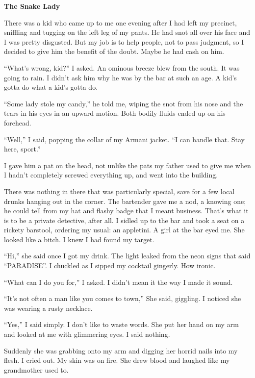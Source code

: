 

{\bf The Snake Lady}



There was a kid who came up to me one evening after I had left my
precinct, sniffling and tugging on the left leg of my pants. He had
snot all over his face and I was pretty disgusted. But my job is to
help people, not to pass judgment, so I decided to give him the
benefit of the doubt. Maybe he had cash on him.

``What's wrong, kid?'' I asked. An ominous breeze
blew from the south. It was going to rain. I didn't ask him
why he was by the bar at such an age. A kid's gotta do what a
kid's gotta do.

``Some lady stole my candy,'' he told me, wiping the snot
from his nose and the tears in his eyes in an upward motion. Both
bodily fluids ended up on his forehead.

``Well,'' I said, popping the collar of my Armani jacket.
``I can handle that. Stay here, sport.''

I gave him a pat on the head, not unlike the pats my father used to
give me when I hadn't completely screwed everything up, and
went into the building.



There was nothing in there that was particularly special, save for
a few local drunks hanging out in the corner. The bartender gave me
a nod, a knowing one; he could tell from my hat and flashy badge
that I meant business. That's what it is to be a private
detective, after all. I sidled up to the bar and took a seat on a
rickety barstool, ordering my usual: an appletini. A girl at the
bar eyed me. She looked like a bitch. I knew I had found my
target.



``Hi,'' she said once I got my drink. The light leaked
from the neon signs that said ``PARADISE''. I chuckled as
I sipped my cocktail gingerly. How ironic.

``What can I do you for,'' I asked. I didn't mean
it the way I made it sound.

``It's not often a man like you comes to town,''
She said, giggling. I noticed she was wearing a rusty
necklace.

``Yes,'' I said simply. I don't like to waste
words. She put her hand on my arm and looked at me with glimmering
eyes. I said nothing.

Suddenly she was grabbing onto my arm and digging her horrid nails
into my flesh. I cried out. My skin was on fire. She drew blood and
laughed like my grandmother used to.

